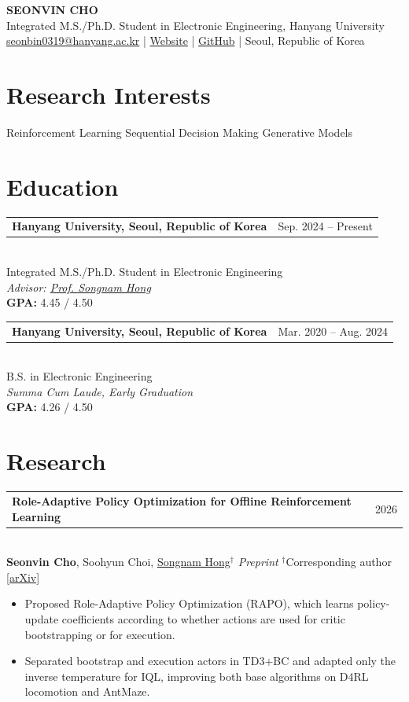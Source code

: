 \documentclass[10pt,a4paper]{article}
\makeatletter
\newcommand{\cvitem}[2]{%
  \begin{tabularx}{\textwidth}{@{}X >{\raggedleft\arraybackslash}p{0.23\textwidth}@{}}
    #1 & #2
  \end{tabularx}%
}
\newcommand{\cventry}[4]{%
  \cvitem{\textbf{#1}}{\textcolor{cvgray}{#2}}\\[-1pt]
  {#3}\\[-1pt]
  {\small\textcolor{cvgray}{#4}}\vspace{2pt}
}
\newcommand{\researchentry}[4]{%
  \begin{tabularx}{\textwidth}{@{}X >{\raggedleft\arraybackslash}p{0.10\textwidth}@{}}
    \textbf{#1} & \textcolor{cvgray}{#2}
  \end{tabularx}\\[-1pt]
  {\small #3}\vspace{1pt}
  \begin{itemize}[leftmargin=1.25em,itemsep=1pt,topsep=1pt,parsep=0pt]
    #4
  \end{itemize}
  \vspace{0pt}
}
\newcommand{\researchsub}[1]{%
  \vspace{2pt}{\small\bfseries\underline{#1}}\par\vspace{1pt}
}
\makeatother
\begin{document}
{\LARGE\bfseries SEONVIN CHO}\\[3pt]
Integrated M.S./Ph.D. Student in Electronic Engineering, Hanyang University\\[2pt]
\href{mailto:seonbin0319@hanyang.ac.kr}{seonbin0319@hanyang.ac.kr}
\;|\;
\href{https://seonvin0319.github.io/index.html}{Website}
\;|\;
\href{https://github.com/seonvin0319}{GitHub}
\;|\;
Seoul, Republic of Korea

\section*{Research Interests}
Reinforcement Learning \;\textperiodcentered\; Sequential Decision Making \;\textperiodcentered\; Generative Models

\section*{Education}
\cventry
  {Hanyang University, Seoul, Republic of Korea}
  {Sep. 2024 -- Present}
  {Integrated M.S./Ph.D. Student in Electronic Engineering}
  {\textit{Advisor: \href{https://sites.google.com/view/snlab}{Prof. Songnam Hong}}}\\[-1pt]
\textbf{GPA:} 4.45 / 4.50
\vspace{3pt}

\cventry
  {Hanyang University, Seoul, Republic of Korea}
  {Mar. 2020 -- Aug. 2024}
  {B.S. in Electronic Engineering}
  {\textit{Summa Cum Laude, Early Graduation}}\\[-1pt]
\textbf{GPA:} 4.26 / 4.50

\section*{Research}

\researchsub{Recent Work}
\researchentry
  {Role-Adaptive Policy Optimization for Offline Reinforcement Learning}
  {2026}
  {\textbf{Seonvin Cho}, Soohyun Choi, \href{https://sites.google.com/view/snlab}{Songnam Hong}$^{\dagger}$ \;\textperiodcentered\; \textit{Preprint} \;\textperiodcentered\; $^{\dagger}$Corresponding author\\
   \href{https://arxiv.org/pdf/2609.40149}{[arXiv]}}
  {
    \item Proposed Role-Adaptive Policy Optimization (RAPO), which learns policy-update coefficients according to whether actions are used for critic bootstrapping or for execution.
    \item Separated bootstrap and execution actors in TD3+BC and adapted only the inverse temperature for IQL, improving both base algorithms on D4RL locomotion and AntMaze.
  }
\end{document}
